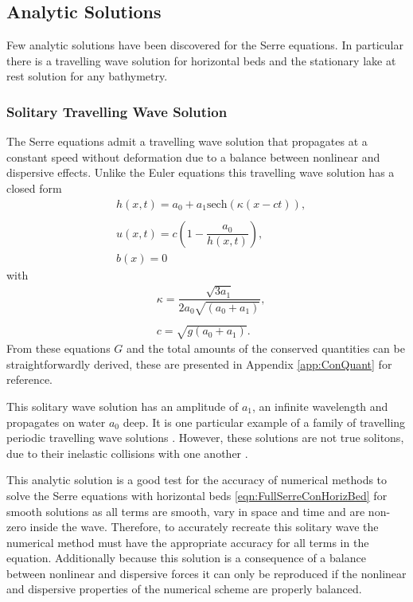 \subsection{Analytic Solutions}
Few analytic solutions have been discovered for the Serre equations. In particular there is a travelling wave solution for horizontal beds \cite{El-etal-2006} and the stationary lake at rest solution for any bathymetry.


\subsubsection{Solitary Travelling Wave Solution}
The Serre equations admit a travelling wave solution that propagates at a constant speed without deformation due to a balance between nonlinear and dispersive effects. Unlike the Euler equations this travelling wave solution has a closed form
\begin{subequations}
	\begin{align}
	&h(x,t) = a_0 + a_1\text{sech}\left(\kappa \left(x - ct\right)\right), \\  \nonumber \\
	&u(x,t) = c\left(1 - \dfrac{a_0}{h(x,t)}\right), \\
	&b(x) = 0
	\end{align}
	\label{eqn:Solitondefhub}
\end{subequations}
with
\begin{align*}
&\kappa = \dfrac{\sqrt{3a_1}}{2 a_0\sqrt{\left(a_0 + a_1\right)}}, \\ \\
&c = \sqrt{g(a_0 + a_1)}.
\end{align*}
From these equations $G$ and the total amounts of the conserved quantities can be straightforwardly derived, these are presented in Appendix \ref{app:ConQuant} for reference. 

This solitary wave solution has an amplitude of $a_1$, an infinite wavelength and propagates on water $a_0$ deep. It is one particular example of a family of travelling periodic travelling wave solutions \cite{El-etal-2006}. However, these solutions are not true solitons, due to their inelastic collisions with one another \cite{Dutykh-etal-2013-761}. 

This analytic solution is a good test for the accuracy of numerical methods to solve the Serre equations with horizontal beds \eqref{eqn:FullSerreConHorizBed} for smooth solutions as all terms are smooth, vary in space and time and are non-zero inside the wave. Therefore, to accurately recreate this solitary wave the numerical method must have the appropriate accuracy for all terms in the equation. Additionally because this solution is a consequence of a balance between nonlinear and dispersive forces it can only be reproduced if the nonlinear and dispersive properties of the numerical scheme are properly balanced.

